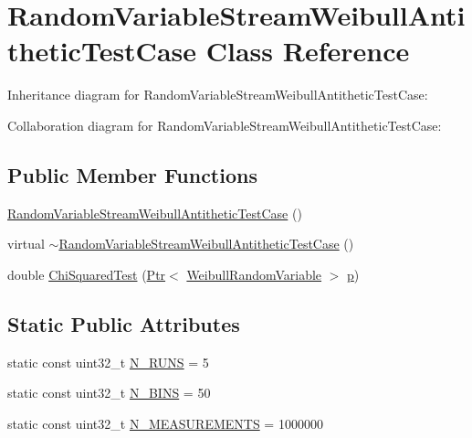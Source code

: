 \hypertarget{classRandomVariableStreamWeibullAntitheticTestCase}{}\section{Random\+Variable\+Stream\+Weibull\+Antithetic\+Test\+Case Class Reference}
\label{classRandomVariableStreamWeibullAntitheticTestCase}


Inheritance diagram for Random\+Variable\+Stream\+Weibull\+Antithetic\+Test\+Case\+:


Collaboration diagram for Random\+Variable\+Stream\+Weibull\+Antithetic\+Test\+Case\+:
\subsection*{Public Member Functions}
\begin{DoxyCompactItemize}
\item 
\hyperlink{classRandomVariableStreamWeibullAntitheticTestCase_a0c36171bd24008a9f87a8cb4c5f553dc}{Random\+Variable\+Stream\+Weibull\+Antithetic\+Test\+Case} ()
\item 
virtual \hyperlink{classRandomVariableStreamWeibullAntitheticTestCase_ace6074a1ddffda6538bea868aaf183dc}{$\sim$\+Random\+Variable\+Stream\+Weibull\+Antithetic\+Test\+Case} ()
\item 
double \hyperlink{classRandomVariableStreamWeibullAntitheticTestCase_a11d8f1f30bde4065c9e4cb8178f4c8a1}{Chi\+Squared\+Test} (\hyperlink{classns3_1_1Ptr}{Ptr}$<$ \hyperlink{classns3_1_1WeibullRandomVariable}{Weibull\+Random\+Variable} $>$ \hyperlink{lte__link__budget__x2__handover__measures_8m_ac9de518908a968428863f829398a4e62}{p})
\end{DoxyCompactItemize}
\subsection*{Static Public Attributes}
\begin{DoxyCompactItemize}
\item 
static const uint32\+\_\+t \hyperlink{classRandomVariableStreamWeibullAntitheticTestCase_ac17120f5eedf02035d6cf81715df2e77}{N\+\_\+\+R\+U\+NS} = 5
\item 
static const uint32\+\_\+t \hyperlink{classRandomVariableStreamWeibullAntitheticTestCase_a2baff2d33d1b05454d39faffabc608e7}{N\+\_\+\+B\+I\+NS} = 50
\item 
static const uint32\+\_\+t \hyperlink{classRandomVariableStreamWeibullAntitheticTestCase_a73448b454c635dea88aa423443fd0ff9}{N\+\_\+\+M\+E\+A\+S\+U\+R\+E\+M\+E\+N\+TS} = 1000000
\end{DoxyCompactItemize}
